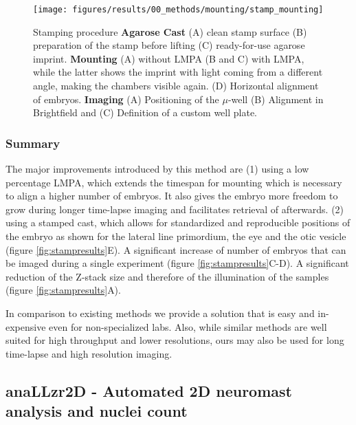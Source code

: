 \documentclass[10pt, b5paper, singlespacinge, twoside]{reedthesis} %
\theoremstyle{definition}
\theoremstyle{definition}
\theoremstyle{definition}
\theoremstyle{remark}
\begin{document}
\begin{figure}[H]

{\centering \texttt{[image: figures/results/00\_methods/mounting/stamp\_mounting]} 

}

\caption[Stamping procedure]{Stamping procedure \textbf{Agarose Cast} (A) clean stamp surface (B) preparation of the stamp before lifting (C) ready-for-use agarose imprint. \textbf{Mounting} (A) without LMPA (B and C) with LMPA, while the latter shows the imprint with light coming from a different angle, making the chambers visible again. (D) Horizontal alignment of embryos. \textbf{Imaging} (A) Positioning of the \(\mu\)-well (B) Alignment in Brightfield and (C) Definition of a custom well plate.}\label{fig:mounting}
\end{figure}
\hypertarget{summary-1}{%
\subsubsection{Summary}\label{summary-1}}

The major improvements introduced by this method are (1) using a low percentage LMPA, which extends the timespan for mounting which is necessary to align a higher number of embryos. It also gives the embryo more freedom to grow during longer time-lapse imaging and facilitates retrieval of afterwards. (2) using a stamped cast, which allows for standardized and reproducible positions of the embryo as shown for the lateral line primordium, the eye and the otic vesicle (figure \ref{fig:stampresults}E). A significant increase of number of embryos that can be imaged during a single experiment (figure \ref{fig:stampresults}C-D). A significant reduction of the Z-stack size and therefore of the illumination of the samples (figure \ref{fig:stampresults}A).

In comparison to existing methods we provide a solution that is easy and in-expensive even for non-specialized labs. Also, while similar methods are well suited for high throughput and lower resolutions, ours may also be used for long time-lapse and high resolution imaging.

\hypertarget{mat-anallzr2d}{%
\subsection{anaLLzr2D - Automated 2D neuromast analysis and nuclei count}\label{mat-anallzr2d}}
\end{document}
